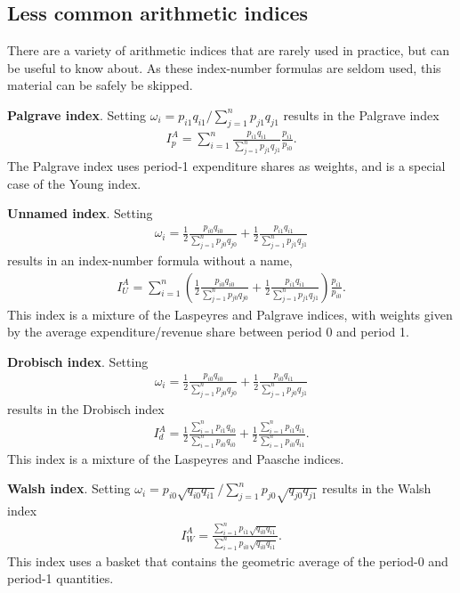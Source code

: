 \documentclass[]{article}
\begin{document}
\hypertarget{less-common-arithmetic-indices}{%
\subsection{Less common arithmetic indices}\label{less-common-arithmetic-indices}}

There are a variety of arithmetic indices that are rarely used in practice, but can be useful to know about. As these index-number formulas are seldom used, this material can be safely be skipped.

\textbf{Palgrave index}. Setting \(\omega_{i} = p_{i1} q_{i1} / \sum_{j = 1}^{n} p_{j1} q_{j1}\) results in the Palgrave index
\begin{align*}
I^{A}_{p} = \sum_{i = 1}^{n} \frac{p_{i1} q_{i1}}{\sum_{j = 1}^{n} p_{j1} q_{j1}} \frac{p_{i1}}{p_{i0}}.
\end{align*}
The Palgrave index uses period-1 expenditure shares as weights, and is a special case of the Young index.

\textbf{Unnamed index}. Setting
\begin{align*}
\omega_{i} = \frac{1}{2} \frac{p_{i0} q_{i0}}{\sum_{j = 1}^{n} p_{j0} q_{j0}} + \frac{1}{2} \frac{p_{i1} q_{i1}}{\sum_{j = 1}^{n} p_{j1} q_{j1}}
\end{align*}
results in an index-number formula without a name,
\begin{align*}
I^{A}_{U} = \sum_{i = 1}^{n} \left(\frac{1}{2} \frac{p_{i0} q_{i0}}{\sum_{j = 1}^{n} p_{j0} q_{j0}} + \frac{1}{2} \frac{p_{i1} q_{i1}}{\sum_{j = 1}^{n} p_{j1} q_{j1}}\right) \frac{p_{i1}}{p_{i0}}.
\end{align*}
This index is a mixture of the Laspeyres and Palgrave indices, with weights given by the average expenditure/revenue share between period 0 and period 1.

\textbf{Drobisch index}. Setting
\begin{align*}
\omega_{i} = \frac{1}{2} \frac{p_{i0} q_{i0}}{\sum_{j = 1}^{n} p_{j0} q_{j0}} + \frac{1}{2} \frac{p_{i0} q_{i1}}{\sum_{j = 1}^{n} p_{j0} q_{j1}}
\end{align*}
results in the Drobisch index
\begin{align*}
I^{A}_{d} = \frac{1}{2} \frac{\sum_{i = 1}^{n} p_{i1} q_{i0}}{\sum_{i = 1}^{n} p_{i0} q_{i0}} + \frac{1}{2} \frac{\sum_{i = 1}^{n} p_{i1} q_{i1}}{\sum_{i = 1}^{n} p_{i0} q_{i1}}.
\end{align*}
This index is a mixture of the Laspeyres and Paasche indices.

\textbf{Walsh index}. Setting \(\omega_{i} = p_{i0} \sqrt{q_{i0} q_{i1}} / \sum_{j = 1}^{n} p_{j0} \sqrt{q_{j0} q_{j1}}\) results in the Walsh index
\begin{align*}
I^{A}_{W} = \frac{\sum_{i = 1}^{n} p_{i1} \sqrt{q_{i0} q_{i1}}}{\sum_{i = 1}^{n} p_{i0} \sqrt{q_{i0} q_{i1}}}.
\end{align*}
This index uses a basket that contains the geometric average of the period-0 and period-1 quantities.
\end{document}
